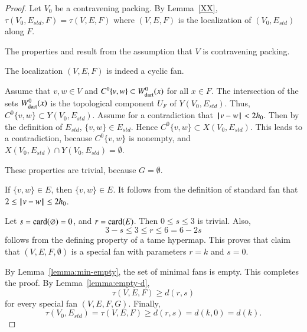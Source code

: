 \begin{proof}
Let $V_0$ be a contravening packing.
By Lemma~\ref{XX}, $\tau(V_0,E_{std},F)=\tau(V,E,F)$  where $(V,E,F)$ is the
localization of
$(V_0,E_{std})$ along $F$. 

  The properties  and
 result from the assumption that $V$ is contravening
packing.  

  The localization $(V,E,F)$ is indeed a cyclic fan.

  Assume that $v,w\in V$ and 
$C^0\{v,w\}\subset W^0_{\text{dart}}(x)$ for all $x\in F$.
The intersection of the sets $W^0_{\text{dart}}(x)$ is the topological component
$U_F$ of $Y(V_0,E_{std})$.  Thus, $C^0\{v,w\}\subset Y(V_0,E_{std})$.
Assume for a contradiction that ${\hskip0.1em|\hskip-0.15em|\hskip0.1em}v - w{\hskip0.1em|\hskip-0.15em|\hskip0.1em}< 2{h_0}$. Then by the definition of $E_{std}$, $\{v,w\}\in E_{std}$.
Hence $C^0\{v,w\}\subset X(V_0,E_{std})$. This leads to a contradiction, because
$C^0\{v,w\}$ is nonempty, and $X(V_0,E_{std})\cap Y(V_0,E_{std})=\emptyset$.

   These properties are trivial, because $G=\emptyset$.

 If $\{v,w\}\in E$, then $\{v,w\}\in E$.  It follows from the definition of
standard fan that $2\le {\hskip0.1em|\hskip-0.15em|\hskip0.1em}v - w{\hskip0.1em|\hskip-0.15em|\hskip0.1em}\le 2{h_0}$.

 Let $s={\operatorname{card}}(\varnothing) = 0$, and $r={\operatorname{card}}(E)$.  Then $0\le s\le 3$ is trivial. Also, 
$$3-s \le 3\le r \le 6=6 - 2s$$
follows from the defining property  of a tame hypermap.  This proves that claim that
$(V,E,F,\emptyset)$ is a special fan with parameters $r=k$ and $s=0$.

By Lemma~\ref{lemma:min-empty}, the set of minimal fans is empty.
This completes the proof.  By Lemma~\ref{lemma:empty-d}, 
$$
\tau(V,E,F) \ge d (r,s)
$$
for every special fan $(V,E,F,G)$. 
Finally, 
$$\tau(V_0,E_{std})=\tau(V,E,F) \ge d(r,s) = d(k,0) = d(k).$$  
\end{proof}


